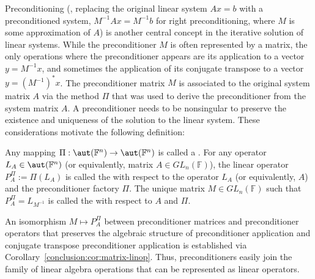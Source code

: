 Preconditioning (\ie, replacing the original linear system $Ax = b$ with a
preconditioned system, \eg $M^{-1}Ax = M^{-1}b$ for right preconditioning, where
$M$ is some approximation of $A$) is another central concept in the iterative
solution of linear systems. While the preconditioner $M$ is often
represented by a matrix, the only operations where the preconditioner appears
are its application to a vector $y = M^{-1}x$, and sometimes the application of
its conjugate transpose to a vector $y = (M^{-1})^*x$. The preconditioner matrix
$M$ is associated to the original system matrix $A$ via the method $\Pi$ that
was used to derive the preconditioner from the system matrix $A$. A
preconditioner needs to be nonsingular to preserve the existence and uniqueness
of the solution to the linear system. These considerations motivate the
following definition:

\begin{definition}
\label{conclusion:def:precond-linop}
Any mapping $\Pi : \aut(\mathbb{F}^n) \rightarrow \aut(\mathbb{F}^n)$ is called
a . For any operator $L_A \in
\aut(\mathbb{F}^n)$ (or equivalently, matrix $A \in GL_n(\mathbb{F})$), the
linear operator $P_A^\Pi := \Pi(L_A)$ is called the  with respect to the operator $L_A$ (or equivalently, $A$) and the
preconditioner factory $\Pi$.  The unique matrix $M \in GL_n(\mathbb{F})$ such
that $P_A^\Pi = L_{M^{-1}}$ is called the  with
respect to $A$ and $\Pi$.
\end{definition}

An isomorphism $M \mapsto P_A^\Pi$ between preconditioner matrices and
preconditioner operators that preserves the algebraic structure of
preconditioner application and conjugate transpose preconditioner application is
established via Corollary~\ref{conclusion:cor:matrix-linop}. Thus,
preconditioners easily join the family of linear algebra operations that can be
represented as linear operators.

